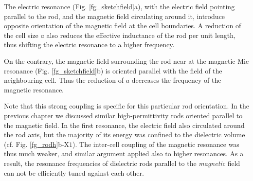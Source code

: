 The electric resonance (Fig. \ref{fg_sketchfield}a), with the electric field pointing parallel to the rod, and the magnetic field circulating around it, introduce opposite orientation of the magnetic field at the cell boundaries. A reduction of the cell size $a$ also reduces the effective inductance of the rod per unit length, thus shifting the electric resonance to a higher frequency.

On the contrary, the magnetic field surrounding the rod near at the magnetic Mie resonance (Fig. \ref{fg_sketchfield}b) is oriented parallel with the field of the neighbouring cell. Thus the reduction of $a$ decreases the frequency of the magnetic resonance.

Note that this strong coupling is specific for this particular rod orientation. In the previous chapter we discussed similar high-permittivity rods oriented parallel to the magnetic field. In the first resonance, the electric field also circulated around the rod axis, but the majority of its energy was confined to the dielectric volume (cf. Fig.  \ref{fg_rodh}b-$\text{X}1$).  The inter-cell coupling of the magnetic resonance was thus much weaker, and similar argument applied also to higher resonances. As a result, the resonance frequencies of dielectric rods parallel to the \textit{magnetic} field can not be efficiently tuned against each other.

